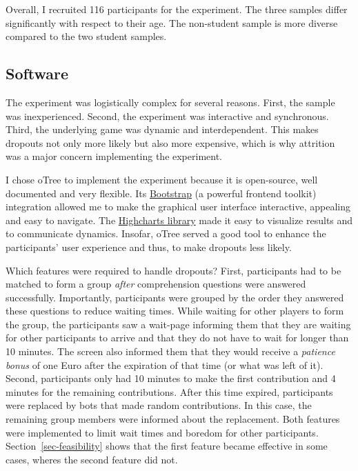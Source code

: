 \documentclass[
  authoryear,
  review,
  3p,
  onecolumn]{elsarticle}
\begin{document}
Overall, I recruited 116 participants for the experiment. The three
samples differ significantly with respect to their age. The non-student
sample is more diverse compared to the two student samples.

\hypertarget{sec-software}{%
\subsection{Software}\label{sec-software}}

The experiment was logistically complex for several reasons. First, the
sample was inexperienced. Second, the experiment was interactive and
synchronous. Third, the underlying game was dynamic and interdependent.
This makes dropouts not only more likely but also more expensive, which
is why attrition was a major concern implementing the experiment.

I chose oTree \citep{oTree} to implement the experiment because it is
open-source, well documented and very flexible. Its
\href{https://getbootstrap.com/}{Bootstrap} (a powerful frontend
toolkit) integration allowed me to make the graphical user interface
interactive, appealing and easy to navigate. The
\href{https://www.highcharts.com/}{Highcharts library} made it easy to
visualize results and to communicate dynamics. Insofar, oTree served a
good tool to enhance the participants' user experience and thus, to make
dropouts less likely.

Which features were required to handle dropouts? First, participants had
to be matched to form a group \emph{after} comprehension questions were
answered successfully. Importantly, participants were grouped by the
order they answered these questions to reduce waiting times. While
waiting for other players to form the group, the participants saw a
wait-page informing them that they are waiting for other participants to
arrive and that they do not have to wait for longer than 10 minutes. The
screen also informed them that they would receive a \emph{patience
bonus} of one Euro after the expiration of that time (or what was left
of it). Second, participants only had 10 minutes to make the first
contribution and 4 minutes for the remaining contributions. After this
time expired, participants were replaced by bots that made random
contributions. In this case, the remaining group members were informed
about the replacement. Both features were implemented to limit wait
times and boredom for other participants. Section~\ref{sec-feasibility}
shows that the first feature became effective in some cases, wheres the
second feature did not.
\end{document}
